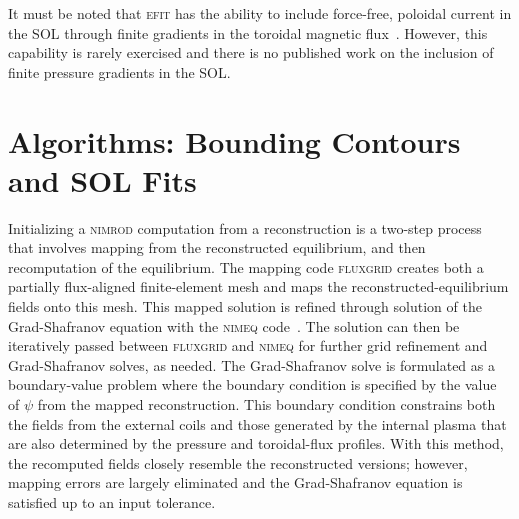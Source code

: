 \documentclass[english,aps,superscriptaddress,showkeys,showpacs,prepri,twocolumn]{revtex4}
\begin{document}
It must be noted that \textsc{efit} has the ability to include force-free,
poloidal current in the SOL through finite gradients in the toroidal magnetic
flux~\cite{Lao:1991vk,Strait:1991uo}. However, this capability is rarely exercised
and there is no published work on the inclusion of finite pressure gradients
in the SOL.

%
\section{Algorithms: Bounding Contours and SOL Fits}
\label{sec:algorithms}

Initializing a \textsc{nimrod} computation from a reconstruction is a
two-step process that involves mapping from the reconstructed equilibrium, and
then recomputation of the equilibrium.  The mapping
code \textsc{fluxgrid} creates both a partially flux-aligned finite-element mesh
and maps the reconstructed-equilibrium fields onto this mesh.  This
mapped solution is refined through solution of the Grad-Shafranov
equation with the \textsc{nimeq} code~\cite{Howell14}. The solution can
then be iteratively passed between \textsc{fluxgrid} and \textsc{nimeq}
for further grid refinement and Grad-Shafranov solves, as needed. The
Grad-Shafranov solve is formulated as a boundary-value problem where the
boundary condition is specified by the value of $\psi$ from the mapped
reconstruction.  This boundary condition constrains both the fields from
the external coils and those generated by the internal plasma that are
also determined by the pressure and toroidal-flux profiles.  With this
method, the recomputed fields closely resemble the reconstructed
versions; however, mapping errors are largely eliminated and the
Grad-Shafranov equation is satisfied up to an input tolerance. 
\end{document}
